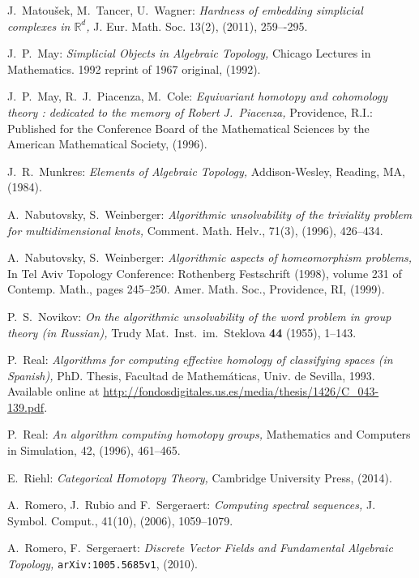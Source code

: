 \documentclass[12pt,a4wide]{article}
\theoremstyle{plain}
\theoremstyle{definition}
\renewcommand\:{\colon}
\begin{document}
\begin{thebibliography}{99}
J.~Matou\v{sek}, M.~Tancer, U.~Wagner:
\emph{Hardness of embedding simplicial complexes in $\mathbb{R}^d$,} J. Eur. Math. Soc. 13(2), (2011), 259–-295.

J.~P.~May:
\emph{Simplicial Objects in Algebraic Topology,} Chicago Lectures in Mathematics. 1992 reprint of 1967 original, (1992).

J.~P.~May, R.~J.~Piacenza, M.~Cole:
\emph{Equivariant homotopy and cohomology theory : dedicated to the memory of Robert J.~Piacenza,}
Providence, R.I.: Published for the Conference Board of the Mathematical Sciences by the American Mathematical Society, (1996).

J.~R.~Munkres:
\emph{Elements of Algebraic Topology,}
Addison-Wesley, Reading, MA, (1984).

A.~Nabutovsky, S.~Weinberger:
\emph{Algorithmic unsolvability of the triviality problem for multidimensional knots,}
Comment. Math. Helv., 71(3), (1996), 426–434.

A.~Nabutovsky, S.~Weinberger:
\emph{Algorithmic aspects of homeomorphism problems,}
 In Tel Aviv Topology Conference: Rothenberg Festschrift (1998), volume 231 of Contemp. Math., pages 245–250. Amer. Math. Soc., Providence, RI, (1999).

P.~S.~Novikov:
\emph{On the algorithmic unsolvability of the word problem in
  group theory (in Russian),}
Trudy Mat.\ Inst.\ im.\ Steklova {\bf 44} (1955), 1--143.

P.~Real:
\emph{Algorithms for computing effective homology of classifying spaces (in Spanish),}
PhD. Thesis, Facultad de Mathem\'{a}ticas, Univ. de Sevilla, 1993. Available online at \url{http://fondosdigitales.us.es/media/thesis/1426/C_043-139.pdf}.


P.~Real:
\emph{An algorithm computing homotopy groups,}
 Mathematics and Computers in Simulation, 42, (1996), 461--465.

E.~Riehl:
\emph{Categorical Homotopy Theory,} Cambridge University Press,  (2014).

A.~Romero, J.~Rubio and F.~Sergeraert:
\emph{Computing spectral sequences,}
 J. Symbol. Comput., 41(10), (2006), 1059--1079.


A.~Romero, F.~Sergeraert:
  \emph{Discrete Vector Fields and Fundamental Algebraic Topology,}
\verb+arXiv:1005.5685v1+, (2010).


\end{thebibliography}
\end{document}
